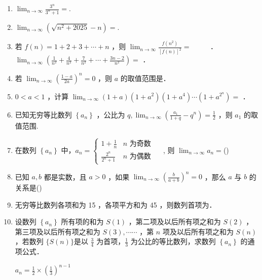 \begin{enumerate}


\item $\lim _{n \rightarrow \infty} \frac{3^n}{3^n+1}=$.

\item $\lim _{n \rightarrow \infty}\left(\sqrt{n^2+2025}-n\right)=$.

\item 若 $f(n)=1+2+3+\cdots+n$ ，则 $\lim _{n \rightarrow \infty} \frac{f\left(n^2\right)}{[f(n)]^2}=$ $\qquad$ ． $\lim _{n \rightarrow \infty}\left(\frac{1}{n^2}+\frac{4}{n^2}+\frac{7}{n^2}+\cdots+\frac{3 n-2}{n^2}\right)=$ ．

\item 若 $\lim _{n \rightarrow \infty}\left(\frac{1-a}{2 a}\right)^n=0$ ，则 $a$ 的取值范围是．

\item $0<a<1$ ，计算 $\lim _{n \rightarrow \infty}(1+a)\left(1+a^2\right)\left(1+a^4\right) \cdots\left(1+a^{2^n}\right)=$ ．

\item 已知无穷等比数列 $\left\{a_n\right\}$ ，公比为 $q, \lim _{n \rightarrow \infty}\left(\frac{a_1}{1+q}-q^n\right)=\frac{1}{2}$ ，则 $a_1$ 的取值范围.

\item 在数列 $\left\{a_n\right\}$ 中，$a_n=\left\{\begin{array}{cl}1+\frac{1}{n} & n \text { 为奇数 } \\ \frac{2^n}{2^n+1} & n \text { 为偶数 }\end{array} \quad\right.$, 则 $\lim _{n \rightarrow \infty} a_n=$\dotfill{}()

\item 已知 $a, b$ 都是实数，且 $a>0$ ，如果 $\lim _{n \rightarrow \infty}\left(\frac{b}{a+b}\right)^n=0$ ，那么 $a$ 与 $b$ 的关系是\dotfill{}()


\item 无穷等比数列各项和为 15 ，各项平方和为 45 ，则数列首项为．

\item 设数列 $\left\{a_n\right\}$ 所有项的和为 $S(1)$ ，第二项及以后所有项之和为 $S(2)$ ，第三项及以后所有项之和为 $S(3), \cdots \cdots$ ，第 $n$ 项及以后所有项之和为 $S(n)$ ，若数列 $\{S(n)\}$是以 $\frac{3}{4}$ 为首项，$\frac{1}{3}$ 为公比的等比数列，求数列 $\left\{a_n\right\}$ 的通项公式．
\begin{jieda}
    $a_n=\frac{1}{2}\times(\frac{1}{3})^{n-1}$
\end{jieda}



\end{enumerate}
